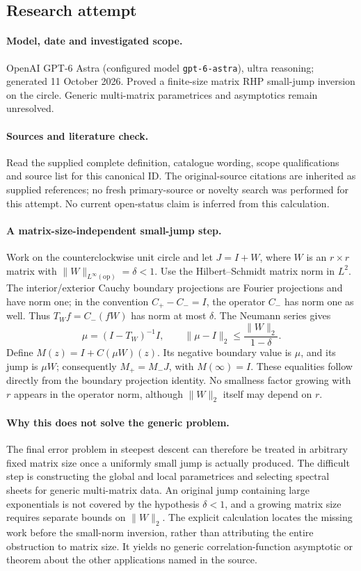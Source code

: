 \documentclass[11pt]{article}
\begin{document}
\subsection{Research attempt}
\paragraph{Model, date and investigated scope.}
OpenAI GPT-6 Astra (configured model \texttt{gpt-6-astra}), ultra reasoning; generated 11 October 2026. Proved a finite-size matrix RHP small-jump inversion on the circle. Generic multi-matrix parametrices and asymptotics remain unresolved.

\paragraph{Sources and literature check.}
Read the supplied complete definition, catalogue wording, scope qualifications and source list for this canonical ID. The original-source citations are inherited as supplied references; no fresh primary-source or novelty search was performed for this attempt. No current open-status claim is inferred from this calculation.

\paragraph{A matrix-size-independent small-jump step.}Work on the counterclockwise unit circle and let \(J=I+W\), where \(W\) is an \(r\times r\) matrix with \(\|W\|_{L^\infty(\mathrm{op})}=\delta<1\). Use the Hilbert--Schmidt matrix norm in \(L^2\). The interior/exterior Cauchy boundary projections are Fourier projections and have norm one; in the convention \(C_+-C_-=I\), the operator \(C_-\) has norm one as well. Thus \(T_Wf=C_-(fW)\) has norm at most \(\delta\). The Neumann series gives
\[\mu=(I-T_W)^{-1}I,\qquad \|\mu-I\|_2\le\frac{\|W\|_2}{1-\delta}.
\]
Define \(M(z)=I+C(\mu W)(z)\). Its negative boundary value is \(\mu\), and its jump is \(\mu W\); consequently \(M_+=M_-J\), with \(M(\infty)=I\). These equalities follow directly from the boundary projection identity. No smallness factor growing with \(r\) appears in the operator norm, although \(\|W\|_2\) itself may depend on \(r\).
\paragraph{Why this does not solve the generic problem.}The final error problem in steepest descent can therefore be treated in arbitrary fixed matrix size once a uniformly small jump is actually produced. The difficult step is constructing the global and local parametrices and selecting spectral sheets for generic multi-matrix data. An original jump containing large exponentials is not covered by the hypothesis \(\delta<1\), and a growing matrix size requires separate bounds on \(\|W\|_2\). The explicit calculation locates the missing work before the small-norm inversion, rather than attributing the entire obstruction to matrix size. It yields no generic correlation-function asymptotic or theorem about the other applications named in the source.
\end{document}
